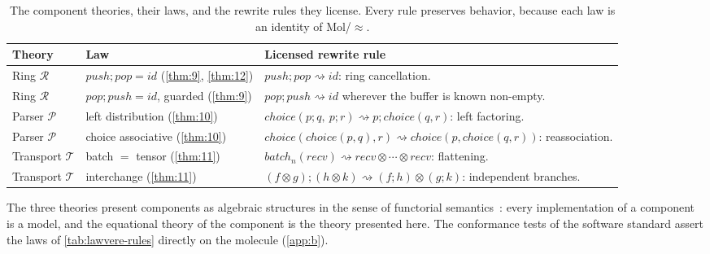 \begin{table}[htbp]
\centering
\small
\caption{The component theories, their laws, and the rewrite rules they
license. Every rule preserves behavior, because each law is an identity of
Mol/$\approx$.}
\label{tab:lawvere-rules}
\begin{tabular}{@{}llp{6.5cm}@{}}
\toprule
Theory & Law & Licensed rewrite rule\\
\midrule
Ring $\mathcal{R}$ & $\mathit{push};\mathit{pop} = \mathit{id}$
(\ref{thm:9}, \ref{thm:12}) & $\mathit{push};\mathit{pop} \rightsquigarrow
\mathit{id}$: ring cancellation.\\
Ring $\mathcal{R}$ & $\mathit{pop};\mathit{push} = \mathit{id}$, guarded
(\ref{thm:9}) & $\mathit{pop};\mathit{push} \rightsquigarrow
\mathit{id}$ wherever the buffer is known non-empty.\\
Parser $\mathcal{P}$ & left distribution (\ref{thm:10}) &
$\mathit{choice} (p;q,\ p;r) \rightsquigarrow p;\mathit{choice} (q,r)$:
left factoring.\\
Parser $\mathcal{P}$ & choice associative (\ref{thm:10}) &
$\mathit{choice} (\mathit{choice} (p,q),r) \rightsquigarrow
\mathit{choice} (p,\mathit{choice} (q,r))$: reassociation.\\
Transport $\mathcal{T}$ & batch $=$ tensor (\ref{thm:11}) &
$\mathit{batch}_{n} (\mathit{recv}) \rightsquigarrow
\mathit{recv} \otimes \cdots \otimes \mathit{recv}$: flattening.\\
Transport $\mathcal{T}$ & interchange (\ref{thm:11}) &
$(f \otimes g);(h \otimes k) \rightsquigarrow (f;h) \otimes (g;k)$:
independent branches.\\
\bottomrule
\end{tabular}
\end{table}

\begin{remark}
The three theories present components as algebraic structures in the sense
of functorial semantics~\cite{lawvere, arxiv-lawvere}: every implementation
of a component is a model, and the equational theory of the component is
the theory presented here. The conformance tests of the software standard
assert the laws of \autoref{tab:lawvere-rules} directly on the molecule
(\autoref{app:b}).
\end{remark}
